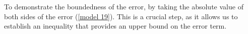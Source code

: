 \documentclass[journal,onecolumn]{IEEEtran}
\begin{document}











To demonstrate the boundedness of the error, by taking the absolute value of both sides of the error (\ref{model 19}). This is a crucial step, as it allows us to establish an inequality that provides an upper bound on the error term.
\end{document}
